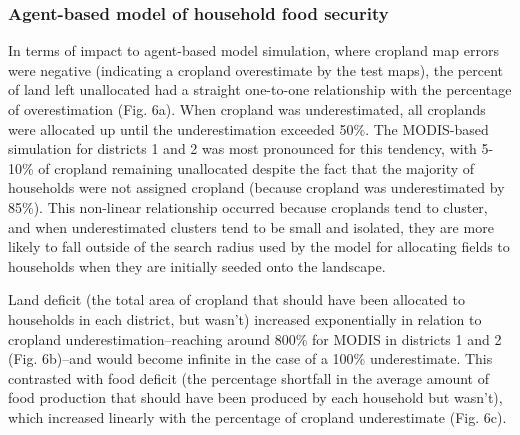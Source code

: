 \documentclass[12 pt, titlepage, a4paper]{article}
\begin{document}

\vspace{-0.3 cm}
\subsubsection*{Agent-based model of household food security}
\vspace{-0.2 cm}
In terms of impact to agent-based model simulation, where cropland map errors were negative (indicating a cropland overestimate by the test maps), the percent of land left unallocated had a straight one-to-one relationship with the percentage of overestimation (Fig. 6a). When cropland was underestimated, all croplands were allocated up until the underestimation exceeded 50\%. The MODIS-based simulation for districts 1 and 2 was most pronounced for this tendency, with 5-10\% of cropland remaining unallocated despite the fact that the majority of households were not assigned cropland (because cropland was underestimated by 85\%). This non-linear relationship occurred because croplands tend to cluster, and when underestimated clusters tend to be small and isolated, they are more likely to fall outside of the search radius used by the model for allocating fields to households when they are initially seeded onto the landscape. 

Land deficit (the total area of cropland that should have been allocated to households in each district, but wasn't) increased exponentially in relation to cropland underestimation--reaching around 800\% for MODIS in districts 1 and 2 (Fig. 6b)--and would become infinite in the case of a 100\% underestimate. This contrasted with food deficit (the percentage shortfall in the average amount of food production that should have been produced by each household but wasn't), which increased linearly with the percentage of cropland underestimate (Fig. 6c). 
\end{document}
